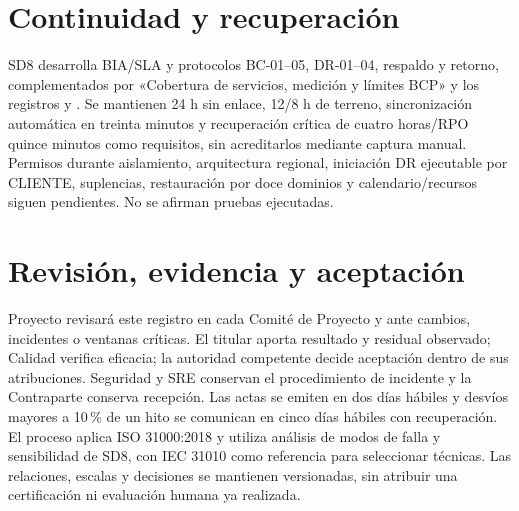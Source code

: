 \documentclass[11pt,letterpaper]{report}
\begin{document}
\section{Continuidad y recuperación}
SD8 desarrolla BIA/SLA y protocolos BC-01--05, DR-01--04, respaldo y retorno, complementados por «Cobertura de servicios, medición y límites BCP» y los registros  y . Se mantienen 24 h sin enlace, 12/8 h de terreno, sincronización automática en treinta minutos y recuperación crítica de cuatro horas/RPO quince minutos como requisitos, sin acreditarlos mediante captura manual. Permisos durante aislamiento, arquitectura regional, iniciación DR ejecutable por CLIENTE, suplencias, restauración por doce dominios y calendario/recursos siguen pendientes. No se afirman pruebas ejecutadas.
\section{Revisión, evidencia y aceptación}
Proyecto revisará este registro en cada Comité de Proyecto y ante cambios, incidentes o ventanas críticas. El titular aporta resultado y residual observado; Calidad verifica eficacia; la autoridad competente decide aceptación dentro de sus atribuciones. Seguridad y SRE conservan el procedimiento de incidente y la Contraparte conserva recepción. Las actas se emiten en dos días hábiles y desvíos mayores a 10\,\% de un hito se comunican en cinco días hábiles con recuperación. \parencites[art.~71, pp.~37--38]{sd8-ba}[RT-19.04/09/10, pp.~33--34]{sd8-bt}
El proceso aplica ISO 31000:2018 y utiliza análisis de modos de falla y sensibilidad de SD8, con IEC 31010 como referencia para seleccionar técnicas. Las relaciones, escalas y decisiones se mantienen versionadas, sin atribuir una certificación ni evaluación humana ya realizada. \parencite{sd8-iso31000,sd8-31010}
\CierreSubdocumento
\end{document}
